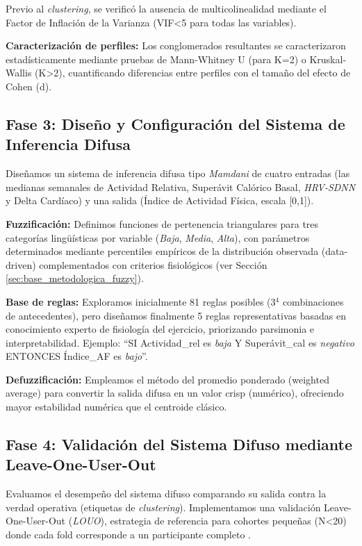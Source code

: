 Previo al \textit{clustering}, se verificó la ausencia de multicolinealidad mediante el Factor de Inflación de la Varianza (VIF<5 para todas las variables).

\textbf{Caracterización de perfiles:} Los conglomerados resultantes se caracterizaron estadísticamente mediante pruebas de Mann-Whitney U (para K=2) o Kruskal-Wallis (K>2), cuantificando diferencias entre perfiles con el tamaño del efecto de Cohen (d).

\subsection{Fase 3: Diseño y Configuración del Sistema de Inferencia Difusa}
\label{subsec:fase3_diseno_fuzzy}

Diseñamos un sistema de inferencia difusa tipo \textit{Mamdani} de cuatro entradas (las medianas semanales de Actividad Relativa, Superávit Calórico Basal, \textit{HRV-SDNN} y Delta Cardíaco) y una salida (Índice de Actividad Física, escala [0,1]).

\textbf{Fuzzificación:} Definimos funciones de pertenencia triangulares para tres categorías lingüísticas por variable (\textit{Baja}, \textit{Media}, \textit{Alta}), con parámetros determinados mediante percentiles empíricos de la distribución observada (data-driven) complementados con criterios fisiológicos (ver Sección \ref{sec:base_metodologica_fuzzy}).

\textbf{Base de reglas:} Exploramos inicialmente 81 reglas posibles (3$^4$ combinaciones de antecedentes), pero diseñamos finalmente 5 reglas representativas basadas en conocimiento experto de fisiología del ejercicio, priorizando parsimonia e interpretabilidad. Ejemplo: ``SI Actividad\_rel es \textit{baja} Y Superávit\_cal es \textit{negativo} ENTONCES Índice\_AF es \textit{bajo}''.

\textbf{Defuzzificación:} Empleamos el método del promedio ponderado (weighted average) para convertir la salida difusa en un valor crisp (numérico), ofreciendo mayor estabilidad numérica que el centroide clásico.

\subsection{Fase 4: Validación del Sistema Difuso mediante Leave-One-User-Out}
\label{subsec:fase4_validacion_louo}

Evaluamos el desempeño del sistema difuso comparando su salida contra la verdad operativa (etiquetas de \textit{clustering}). Implementamos una validación Leave-One-User-Out (\textit{LOUO}), estrategia de referencia para cohortes pequeñas (N<20) donde cada fold corresponde a un participante completo \cite{Alinia2020,Crozat2025}.

